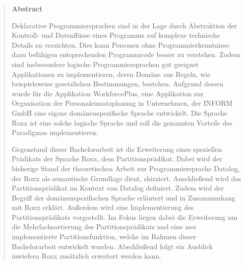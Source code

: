 \documentclass[
a4paper,12pt,listof=toc,bibliography=totoc,twoside, titlepage, headsepline,headings=optiontohead,parskip=half,
BCOR=8.25mm,         %
DIV=12,              %
headsepline=on,      %
]{scrartcl}
\begin{document}
\pagestyle{empty}
\begin{quote}
	\begin{center}
		\textbf{\Large\sffamily Abstract}
		\vspace{0.3cm}
	\end{center}
	Deklarative Programmiersprachen sind in der Lage durch Abstraktion der Kontroll- und Datenflüsse eines Programms auf komplexe technische Details zu verzichten. Dies kann Personen ohne Programmierkenntnisse dazu befähigen entsprechenden Programmcode besser zu verstehen. Zudem sind insbesondere logische Programmiersprachen gut geeignet Applikationen zu implementieren, deren Domäne aus Regeln, wie beispielsweise gesetzlichen Bestimmungen, bestehen. Aufgrund dessen wurde für die Applikation WorkforcePlus, eine Applikation zur Organisation der Personaleinsatzplanung in Unternehmen, der INFORM GmbH eine eigene domänenspezifische Sprache entwickelt. Die Sprache Roxx ist eine solche logische Sprache und soll die genannten Vorteile des Paradigmas implementieren.
	
	\vspace{0.1cm}
	Gegenstand dieser Bachelorarbeit ist die Erweiterung eines speziellen Prädikats der Sprache Roxx, dem Partitionsprädikat. Dabei wird der bisherige Stand der theoretischen Arbeit zur Programmiersprache Datalog, der Roxx als semantische Grundlage dient, skizziert. Anschließend wird das Partitionsprädikat im Kontext von Datalog definiert. Zudem wird der Begriff der domänenspezifischen Sprache erläutert und in Zusammenhang mit Roxx erklärt. Außerdem wird eine Implementierung des Partitionsprädikats vorgestellt. Im Fokus liegen dabei die Erweiterung um die Mehrfachsortierung des Partitionsprädikats und eine neu implementierte Partitionsfunktion, welche im Rahmen dieser Bachelorarbeit entwickelt wurden. Abschließend folgt ein Ausblick inwiefern Roxx zusätzlich erweitert werden kann.
	
\end{quote}

\cleardoubleemptypage

	
	
	
\end{document}

